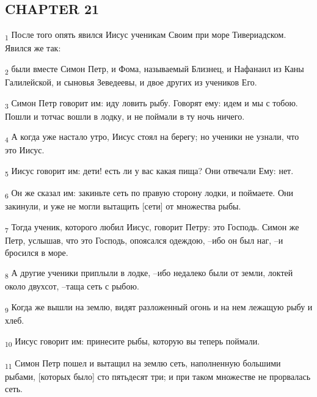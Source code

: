 \subsection{CHAPTER 21}
\begin{tcolorbox}
\textsubscript{1} После того опять явился Иисус ученикам Своим при море Тивериадском. Явился же так:
\end{tcolorbox}
\begin{tcolorbox}
\textsubscript{2} были вместе Симон Петр, и Фома, называемый Близнец, и Нафанаил из Каны Галилейской, и сыновья Зеведеевы, и двое других из учеников Его.
\end{tcolorbox}
\begin{tcolorbox}
\textsubscript{3} Симон Петр говорит им: иду ловить рыбу. Говорят ему: идем и мы с тобою. Пошли и тотчас вошли в лодку, и не поймали в ту ночь ничего.
\end{tcolorbox}
\begin{tcolorbox}
\textsubscript{4} А когда уже настало утро, Иисус стоял на берегу; но ученики не узнали, что это Иисус.
\end{tcolorbox}
\begin{tcolorbox}
\textsubscript{5} Иисус говорит им: дети! есть ли у вас какая пища? Они отвечали Ему: нет.
\end{tcolorbox}
\begin{tcolorbox}
\textsubscript{6} Он же сказал им: закиньте сеть по правую сторону лодки, и поймаете. Они закинули, и уже не могли вытащить [сети] от множества рыбы.
\end{tcolorbox}
\begin{tcolorbox}
\textsubscript{7} Тогда ученик, которого любил Иисус, говорит Петру: это Господь. Симон же Петр, услышав, что это Господь, опоясался одеждою, --ибо он был наг, --и бросился в море.
\end{tcolorbox}
\begin{tcolorbox}
\textsubscript{8} А другие ученики приплыли в лодке, --ибо недалеко были от земли, локтей около двухсот, --таща сеть с рыбою.
\end{tcolorbox}
\begin{tcolorbox}
\textsubscript{9} Когда же вышли на землю, видят разложенный огонь и на нем лежащую рыбу и хлеб.
\end{tcolorbox}
\begin{tcolorbox}
\textsubscript{10} Иисус говорит им: принесите рыбы, которую вы теперь поймали.
\end{tcolorbox}
\begin{tcolorbox}
\textsubscript{11} Симон Петр пошел и вытащил на землю сеть, наполненную большими рыбами, [которых было] сто пятьдесят три; и при таком множестве не прорвалась сеть.
\end{tcolorbox}
